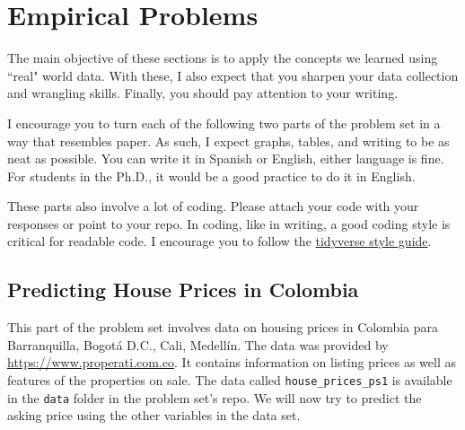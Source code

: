 \documentclass[12pt,onecolumn]{article}
\begin{document}
\pagebreak

\section{Empirical Problems}

The main objective of these sections is to apply the concepts we learned using ``real" world data. With these, I also expect that you sharpen your data collection and wrangling skills. Finally, you should pay attention to your writing.

I encourage you to turn each of the following two parts of the problem set in a way that resembles paper. As such, I expect graphs, tables, and writing to be as neat as possible. You can write it in Spanish or English, either language is fine. For students in the Ph.D., it would be a good practice to do it in English.

These parts also involve a lot of coding. Please attach your code with your responses or point to your repo. In coding, like in writing, a good coding style is critical for readable code. I encourage you to follow the \href{https://style.tidyverse.org/}{tidyverse style guide}.


\subsection{Predicting House Prices in Colombia}

This part of the problem set involves data on housing prices in Colombia para Barranquilla, Bogotá D.C., Cali, Medellín. The data was provided by \url{https://www.properati.com.co}. It contains information on listing prices as well as features of the properties on sale. The data called \texttt{house\_prices\_ps1} is available in the \texttt{data} folder in the problem set's repo. We will now try to predict the asking price using the other variables in the data set.
\end{document}

